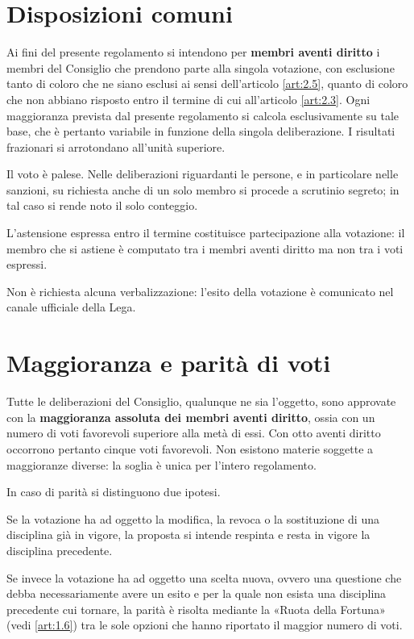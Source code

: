 \section{Disposizioni comuni}
\label{art:2.1}

Ai fini del presente regolamento si intendono per \textbf{membri aventi diritto} i membri del Consiglio che prendono parte alla singola votazione, con esclusione tanto di coloro che ne siano esclusi ai sensi dell'articolo \ref{art:2.5}, quanto di coloro che non abbiano risposto entro il termine di cui all'articolo \ref{art:2.3}. Ogni maggioranza prevista dal presente regolamento si calcola esclusivamente su tale base, che è pertanto variabile in funzione della singola deliberazione. I risultati frazionari si arrotondano all'unità superiore.

Il voto è palese. Nelle deliberazioni riguardanti le persone, e in particolare nelle sanzioni, su richiesta anche di un solo membro si procede a scrutinio segreto; in tal caso si rende noto il solo conteggio.

L'astensione espressa entro il termine costituisce partecipazione alla votazione: il membro che si astiene è computato tra i membri aventi diritto ma non tra i voti espressi.

Non è richiesta alcuna verbalizzazione: l'esito della votazione è comunicato nel canale ufficiale della Lega.

\section{Maggioranza e parità di voti}
\label{art:2.2}

Tutte le deliberazioni del Consiglio, qualunque ne sia l'oggetto, sono approvate con la \textbf{maggioranza assoluta dei membri aventi diritto}, ossia con un numero di voti favorevoli superiore alla metà di essi. Con otto aventi diritto occorrono pertanto cinque voti favorevoli. Non esistono materie soggette a maggioranze diverse: la soglia è unica per l'intero regolamento.

In caso di parità si distinguono due ipotesi.

Se la votazione ha ad oggetto la modifica, la revoca o la sostituzione di una disciplina già in vigore, la proposta si intende respinta e resta in vigore la disciplina precedente.

Se invece la votazione ha ad oggetto una scelta nuova, ovvero una questione che debba necessariamente avere un esito e per la quale non esista una disciplina precedente cui tornare, la parità è risolta mediante la «Ruota della Fortuna» (vedi \ref{art:1.6}) tra le sole opzioni che hanno riportato il maggior numero di voti.

